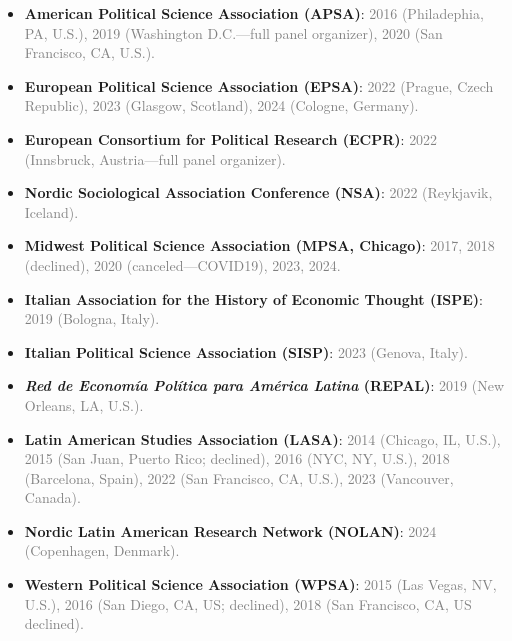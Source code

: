\begin{itemize}
\item[\textcolor{gray}{\textbullet}] {\bf American Political Science Association (APSA)}: \textcolor{gray}{2016 (Philadephia, PA, U.S.), 2019 (Washington D.C.---full panel organizer), 2020 (San Francisco, CA, U.S.).}
\item[\textcolor{gray}{\textbullet}] {\bf European Political Science Association (EPSA)}: \textcolor{gray}{2022 (Prague, Czech Republic), 2023 (Glasgow, Scotland), 2024 (Cologne, Germany).}
\item[\textcolor{gray}{\textbullet}] {\bf European Consortium for Political Research (ECPR)}: \textcolor{gray}{2022 (Innsbruck, Austria---full panel organizer).}
\item[\textcolor{gray}{\textbullet}] {\bf Nordic Sociological Association Conference (NSA)}: \textcolor{gray}{2022 (Reykjavik, Iceland).}
\item[\textcolor{gray}{\textbullet}] {\bf Midwest Political Science Association (MPSA, Chicago)}: \textcolor{gray}{2017, 2018 (declined), 2020 (canceled---COVID19), 2023, 2024.}
\item[\textcolor{gray}{\textbullet}] {\bf Italian Association for the History of Economic Thought (ISPE)}: \textcolor{gray}{2019 (Bologna, Italy).}
\item[\textcolor{gray}{\textbullet}] {\bf Italian Political Science Association (SISP)}: \textcolor{gray}{2023 (Genova, Italy).}
\item[\textcolor{gray}{\textbullet}] {\bf \emph{Red de Econom\'ia Pol\'itica para Am\'erica Latina} (REPAL)}: \textcolor{gray}{2019 (New Orleans, LA, U.S.).}
\item[\textcolor{gray}{\textbullet}] {\bf Latin American Studies Association (LASA)}: \textcolor{gray}{2014 (Chicago, IL, U.S.), 2015 (San Juan, Puerto Rico; declined), 2016 (NYC, NY, U.S.), 2018 (Barcelona, Spain), 2022 (San Francisco, CA, U.S.), 2023 (Vancouver, Canada).}
\item[\textcolor{gray}{\textbullet}] {\bf Nordic Latin American Research Network (NOLAN)}: \textcolor{gray}{2024 (Copenhagen, Denmark).}
\item[\textcolor{gray}{\textbullet}] {\bf Western Political Science Association (WPSA)}: \textcolor{gray}{2015 (Las Vegas, NV, U.S.), 2016 (San Diego, CA, US; declined), 2018 (San Francisco, CA, US declined).}

\end{itemize}

